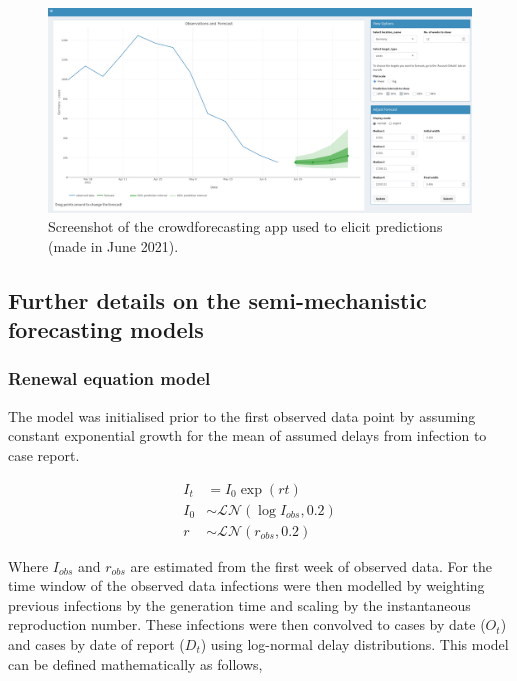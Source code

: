 \documentclass[
]{article}
\begin{document}
\begin{figure}[H]
\includegraphics[width=1\linewidth,]{../crowd-forecast/Screenshot-forecasting-app} \caption{Screenshot of the crowdforecasting app used to elicit predictions (made in June 2021). }\label{fig:screenshot}
\end{figure}

\clearpage

\hypertarget{further-details-on-the-semi-mechanistic-forecasting-models}{%
\subsection{Further details on the semi-mechanistic forecasting models}\label{further-details-on-the-semi-mechanistic-forecasting-models}}

\hypertarget{renewal-equation-model}{%
\subsubsection{Renewal equation model}\label{renewal-equation-model}}

The model was initialised prior to the first observed data point by assuming constant exponential growth for the mean of assumed delays from infection to case report.

\begin{align}
  I_{t} &= I_0 \exp  \left(r t \right)  \\
  I_0 &\sim \mathcal{LN}(\log I_{obs}, 0.2) \\
  r &\sim \mathcal{LN}(r_{obs}, 0.2) 
\end{align}

Where \(I_{obs}\) and \(r_{obs}\) are estimated from the first week of observed data. For the time window of the observed data infections were then modelled by weighting previous infections by the generation time and scaling by the instantaneous reproduction number. These infections were then convolved to cases by date (\(O_t\)) and cases by date of report (\(D_t\)) using log-normal delay distributions. This model can be defined mathematically as follows,
\end{document}
